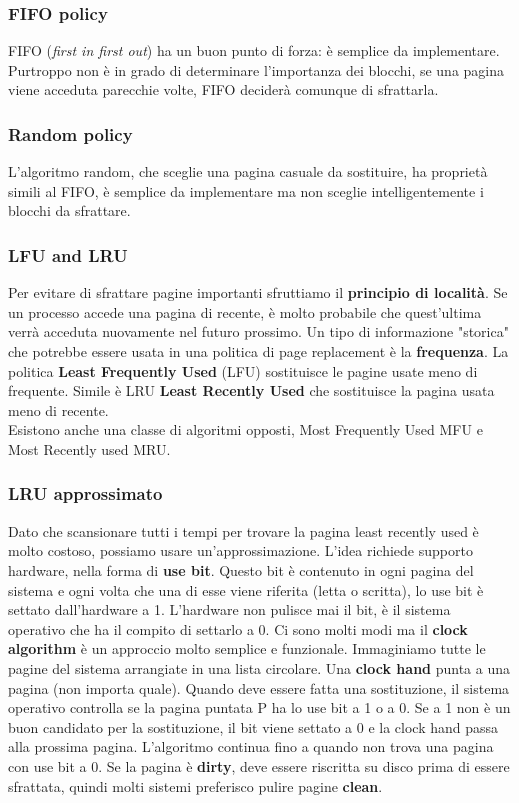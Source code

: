 \documentclass[12pt, letterpaper]{article}
\begin{document}
			\subsubsection{FIFO policy}
				FIFO (\textit{first in first out}) ha un buon punto di forza: è semplice da implementare. Purtroppo non è in grado di determinare l'importanza dei blocchi, se una pagina viene acceduta parecchie volte, FIFO deciderà comunque di sfrattarla.
			
			\subsubsection{Random policy}
				L'algoritmo random, che sceglie una pagina casuale da sostituire, ha proprietà simili al FIFO, è semplice da implementare ma non sceglie intelligentemente i blocchi da sfrattare.
				
			\subsubsection{LFU and LRU }
				Per evitare di sfrattare pagine importanti sfruttiamo il \textbf{principio di località}. Se un processo accede una pagina di recente, è molto probabile che quest'ultima verrà acceduta nuovamente nel futuro prossimo. Un tipo di informazione "storica" che potrebbe essere usata in una politica di page replacement è la \textbf{frequenza}. La politica \textbf{Least Frequently Used} (LFU) sostituisce le pagine usate meno di frequente. Simile è LRU \textbf{Least Recently Used} che sostituisce la pagina usata meno di recente.\\		
				Esistono anche una classe di algoritmi opposti, Most Frequently Used MFU e Most Recently used MRU.
				
			\subsubsection{LRU approssimato}
				Dato che scansionare tutti i tempi per trovare la pagina least recently used è molto costoso, possiamo usare un'approssimazione. L'idea richiede supporto hardware, nella forma di \textbf{use bit}. Questo bit è contenuto in ogni pagina del sistema e ogni volta che una di esse viene riferita (letta o scritta), lo use bit è settato dall'hardware a 1. L'hardware non pulisce mai il bit, è il sistema operativo che ha il compito di settarlo a 0. Ci sono molti modi ma il \textbf{clock algorithm} è un approccio molto semplice e funzionale. Immaginiamo tutte le pagine del sistema arrangiate in una lista circolare. Una \textbf{clock hand} punta a una pagina (non importa quale). Quando deve essere fatta una sostituzione, il sistema operativo controlla se la pagina puntata P ha lo use bit a 1 o a 0. Se a 1 non è un buon candidato per la sostituzione, il bit viene settato a 0 e la clock hand passa alla prossima pagina. L'algoritmo continua fino a quando non trova una pagina con use bit a 0. Se la pagina è \textbf{dirty}, deve essere riscritta su disco prima di essere sfrattata, quindi molti sistemi preferisco pulire pagine \textbf{clean}.
				
\end{document}
